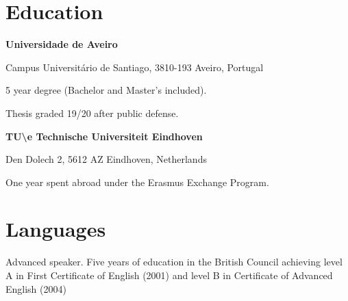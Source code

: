 







\section*{Education}


{
\textbf{Universidade de Aveiro}

Campus Universitário de Santiago, 3810-193 Aveiro, Portugal
}


{
5 year degree (Bachelor and Master's included).

Thesis graded 19/20 after public defense. 
}


\vspace{\baselineskip}


{
\textbf{TU\textbackslash e Technische Universiteit Eindhoven}

Den Dolech 2, 5612 AZ Eindhoven, Netherlands
}

{
One year spent abroad under the Erasmus Exchange Program.
}


\section*{Languages}


{
Advanced speaker. Five years of education in the British Council achieving
level A in First Certificate of English (2001) and level B in Certificate of
Advanced English (2004)
}



